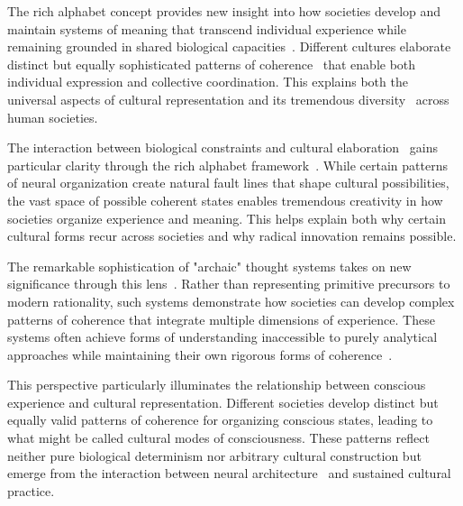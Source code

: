 The rich alphabet concept provides new insight into how societies develop and maintain systems of meaning that transcend individual experience while remaining grounded in shared biological capacities~\cite{rappaport1999ritual,csordas1994embodiment}. Different cultures elaborate distinct but equally sophisticated patterns of coherence~ that enable both individual expression and collective coordination. This explains both the universal aspects of cultural representation and its tremendous diversity~ across human societies.

The interaction between biological constraints and cultural elaboration~ gains particular clarity through the rich alphabet framework~\cite{descola2013beyond,malafouris2013how}. While certain patterns of neural organization create natural fault lines that shape cultural possibilities, the vast space of possible coherent states enables tremendous creativity in how societies organize experience and meaning. This helps explain both why certain cultural forms recur across societies and why radical innovation remains possible.

The remarkable sophistication of "archaic" thought systems takes on new significance through this lens~\cite{kohn2013how}. Rather than representing primitive precursors to modern rationality, such systems demonstrate how societies can develop complex patterns of coherence that integrate multiple dimensions of experience. These systems often achieve forms of understanding inaccessible to purely analytical approaches while maintaining their own rigorous forms of coherence~.

This perspective particularly illuminates the relationship between conscious experience and cultural representation. Different societies develop distinct but equally valid patterns of coherence for organizing conscious states, leading to what might be called cultural modes of consciousness. These patterns reflect neither pure biological determinism nor arbitrary cultural construction but emerge from the interaction between neural architecture~ and sustained cultural practice.

